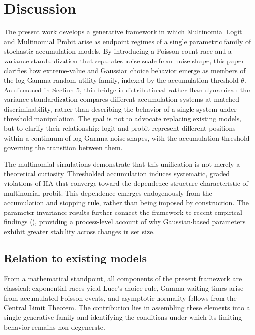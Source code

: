 \documentclass[
  man,
  floatsintext,
  longtable,
  a4paper,
  nolmodern,
  notxfonts,
  notimes,
  colorlinks=true,linkcolor=blue,citecolor=blue,urlcolor=blue]{apa7}
\begin{document}
\section{Discussion}\label{discussion}

The present work develops a generative framework in which Multinomial
Logit and Multinomial Probit arise as endpoint regimes of a single
parametric family of stochastic accumulation models. By introducing a
Poisson count race and a variance standardization that separates noise
scale from noise shape, this paper clarifies how extreme-value and
Gaussian choice behavior emerge as members of the log-Gamma random
utility family, indexed by the accumulation threshold \(\theta\). As
discussed in Section 5, this bridge is distributional rather than
dynamical: the variance standardization compares different accumulation
systems at matched discriminability, rather than describing the behavior
of a single system under threshold manipulation. The goal is not to
advocate replacing existing models, but to clarify their relationship:
logit and probit represent different positions within a continuum of
log-Gamma noise shapes, with the accumulation threshold governing the
transition between them.

The multinomial simulations demonstrate that this unification is not
merely a theoretical curiosity. Thresholded accumulation induces
systematic, graded violations of IIA that converge toward the dependence
structure characteristic of multinomial probit. This dependence emerges
endogenously from the accumulation and stopping rule, rather than being
imposed by construction. The parameter invariance results further
connect the framework to recent empirical findings
(),
providing a process-level account of why Gaussian-based parameters
exhibit greater stability across changes in set size.

\subsection{Relation to existing
models}\label{relation-to-existing-models}

From a mathematical standpoint, all components of the present framework
are classical: exponential races yield Luce's choice rule, Gamma waiting
times arise from accumulated Poisson events, and asymptotic normality
follows from the Central Limit Theorem. The contribution lies in
assembling these elements into a single generative family and
identifying the conditions under which its limiting behavior remains
non-degenerate.
\end{document}
